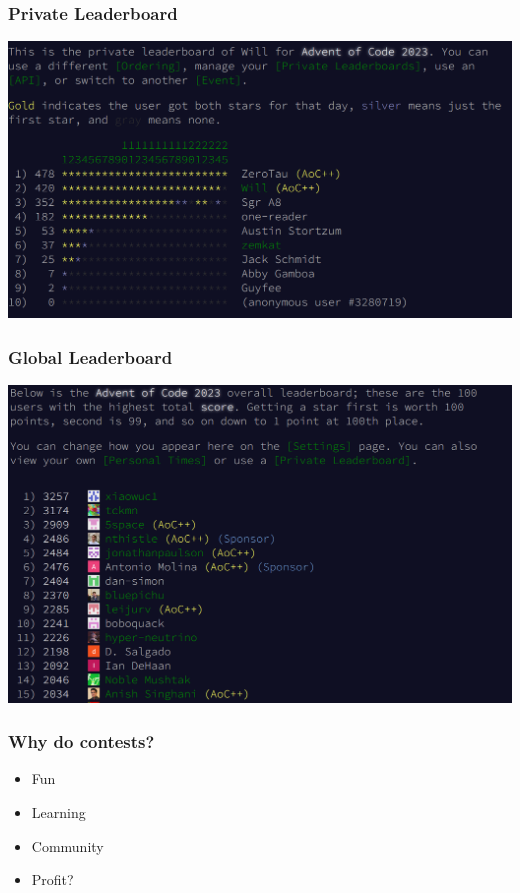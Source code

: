 \begin{frame}
\frametitle{Private Leaderboard}

\begin{center}
\includegraphics[width=\textwidth]{PrivateLeaderboard}
\end{center}

\end{frame}

\begin{frame}
\frametitle{Global Leaderboard}

\begin{center}
\includegraphics[width=\textwidth]{leaderboard}
\end{center}


\end{frame}

\begin{frame}
\frametitle{Why do contests?}

\begin{itemize}
  \setlength\itemsep{1em}
  \item Fun
  \item Learning
  \item Community
  \item Profit?
\end{itemize}

\end{frame}


